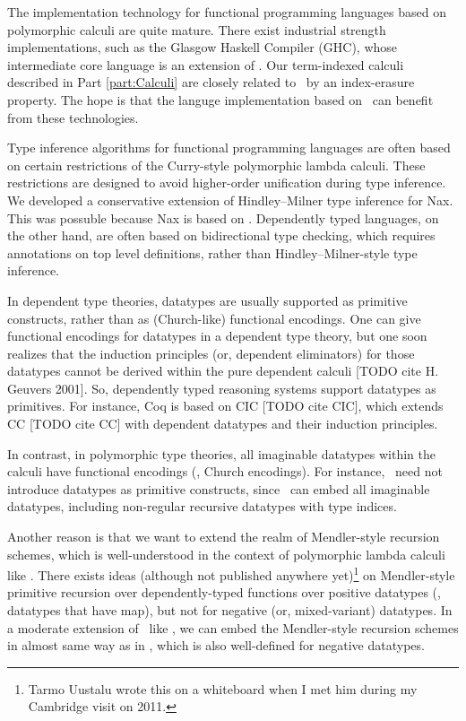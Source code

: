 The implementation technology for functional programming languages based on
polymorphic calculi are quite mature. There exist industrial strength
implementations, such as the Glasgow Haskell Compiler (GHC),
whose intermediate core language is an extension of \Fw.
Our term-indexed calculi described in Part \ref{part:Calculi} are closely
related to \Fw\ by an index-erasure property. The hope is that
the languge implementation based on \Fi\ can benefit from these technologies.

Type inference algorithms for functional programming languages are often
based on certain restrictions of the Curry-style polymorphic lambda calculi.
These restrictions are designed to avoid higher-order unification during type
inference. We developed a conservative extension of Hindley--Milner
type inference for Nax. This was possuble because Nax is based on \Fi.
Dependently typed languages, on the other hand, are often based on
bidirectional type checking, which requires annotations on
top level definitions, rather than Hindley--Milner-style type inference.

In dependent type theories, datatypes are usually supported as
primitive constructs, rather than as (Church-like) functional encodings. 
One can give functional encodings for datatypes in a dependent type theory,
but one soon realizes that the induction principles (or, dependent eliminators)
for those datatypes cannot be derived within the pure dependent calculi
[TODO cite H. Geuvers 2001].
So, dependently typed reasoning systems support datatypes as primitives.
For instance, Coq is based on CIC [TODO cite CIC], which extends
CC [TODO cite CC] with dependent datatypes and their induction principles.

In contrast, in polymorphic type theories, all imaginable datatypes
within the calculi have functional encodings (\eg, Church encodings).
For instance, \Fw\ need not introduce datatypes as primitive constructs,
since \Fw\ can embed all imaginable datatypes, including non-regular
recursive datatypes with type indices.

Another reason is that we want to extend the realm of 
Mendler-style recursion schemes, which is well-understood
in the context of polymorphic lambda calculi like \Fw.
There exists ideas (although not published anywhere yet)\footnote{
     Tarmo Uustalu wrote this on a whiteboard
     when I met him during my Cambridge visit on 2011.}
on Mendler-style primitive recursion over dependently-typed functions
over positive datatypes (\ie, datatypes that have map), but not for
negative (or, mixed-variant) datatypes.
In a moderate extension of \Fw\ like \Fi, we can embed the Mendler-style
recursion schemes in almost same way as in \Fw, which is also well-defined
for negative datatypes.

